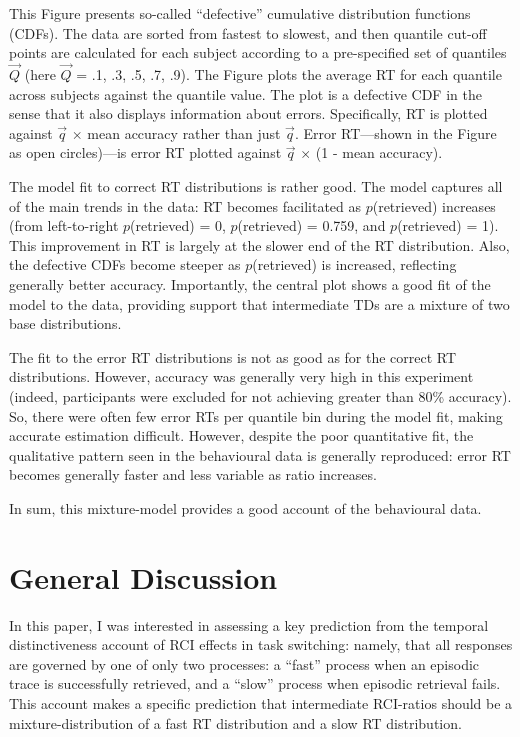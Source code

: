 \documentclass[a4paper, jou, natbib]{apa6}
\begin{document}
This Figure presents so-called ``defective'' cumulative distribution functions (CDFs). The data are sorted from fastest to slowest, and then quantile cut-off points are calculated for each subject according to a pre-specified set of quantiles $\vec{Q}$ (here $\vec{Q}$ = .1, .3, .5, .7, .9). The Figure plots the average RT for each quantile across subjects against the quantile value. The plot is a defective CDF in the sense that it also displays information about errors. Specifically, RT is plotted against $\vec{q}$ $\times$ mean accuracy rather than just $\vec{q}$. Error RT---shown in the Figure as open circles)---is error RT plotted against $\vec{q}$ $\times$ (1 - mean accuracy).

The model fit to correct RT distributions is rather good. The model captures all of the main trends in the data: RT becomes facilitated as $p$(retrieved) increases (from left-to-right $p$(retrieved) = 0, $p$(retrieved) = 0.759, and $p$(retrieved) = 1). This improvement in RT is largely at the slower end of the RT distribution. Also, the defective CDFs become steeper as $p$(retrieved) is increased, reflecting generally better accuracy. Importantly, the central plot shows a good fit of the model to the data, providing support that intermediate TDs are a mixture of two base distributions. 

The fit to the error RT distributions is not as good as for the correct RT distributions. However, accuracy was generally very high in this experiment (indeed, participants were excluded for not achieving greater than 80\% accuracy). So, there were often few error RTs per quantile bin during the model fit, making accurate estimation difficult. However, despite the poor quantitative fit, the qualitative pattern seen in the behavioural data is generally reproduced: error RT becomes generally faster and less variable as ratio increases.

In sum, this mixture-model provides a good account of the behavioural data.


\section{General Discussion}

In this paper, I was interested in assessing a key prediction from the temporal distinctiveness account of RCI effects in task switching: namely, that all responses are governed by one of only two processes: a ``fast'' process when an episodic trace is successfully retrieved, and a ``slow'' process when episodic retrieval fails. This account makes a specific prediction that intermediate RCI-ratios should be a mixture-distribution of a fast RT distribution and a slow RT distribution. 
\end{document}
